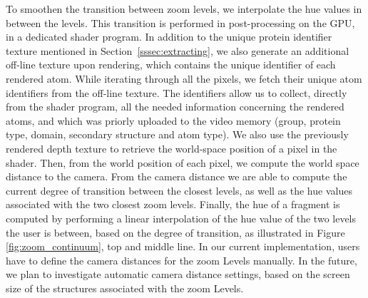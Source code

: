 \documentclass{egpubl}
\begin{document}
	
	To smoothen the transition between zoom levels, we interpolate the hue values in between the levels.	
	This transition is performed in post-processing on the GPU, in a dedicated shader program.
	In addition to the unique protein identifier texture mentioned in Section~\ref{sssec:extracting}, we also generate an additional off-line texture upon rendering, which contains the unique identifier of each rendered atom.
	While iterating through all the pixels, we fetch their unique atom identifiers from the off-line texture.
	The identifiers allow us to collect, directly from the shader program, all the needed information concerning the rendered atoms, and which was priorly uploaded to the video memory (group, protein type, domain, secondary structure and atom type).	
	We also use the previously rendered depth texture to retrieve the world-space position of a pixel in the shader.
	Then, from the world position of each pixel, we compute the world space distance to the camera.
	From the camera distance we are able to compute the current degree of transition between the closest levels, as well as the hue values associated with the two closest zoom levels.	
	Finally, the hue of a fragment is computed by performing a linear interpolation of the hue value of the two levels the user is between, based on the degree of transition, as illustrated in Figure \ref{fig:zoom_continuum}, top and middle line.
	In our current implementation, users have to define the camera distances for the zoom Levels manually. 
	In the future, we plan to investigate automatic camera distance settings, based on the screen size of the structures associated with the zoom Levels.
	
\end{document}

